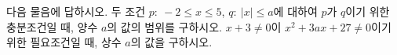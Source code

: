 다음 물음에 답하시오.
 두 조건 $p:\ -2\le x\le 5$, $q:\ |x|\le a$에 대하여 $p$가 $q$이기 위한 충분조건일 때, 양수 $a$의 값의 범위를 구하시오.
 $x+3\ne 0$이 $x^2+3ax+27\ne 0$이기 위한 필요조건일 때, 상수 $a$의 값을 구하시오.
